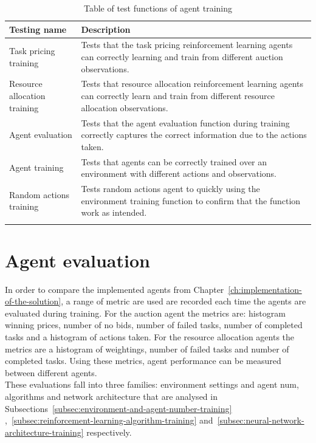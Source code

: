 \begin{longtable}{|p{3cm}|p{11cm}|} \hline
    \textbf{Testing name} & \textbf{Description} \\ \hline
    Task pricing training & Tests that the task pricing reinforcement learning agents can correctly learning and train
        from different auction observations. \\ \hline
    Resource allocation training & Tests that resource allocation reinforcement learning agents can correctly
        learn and train from different resource allocation observations. \\ \hline
    Agent evaluation & Tests that the agent evaluation function during training correctly captures the correct
        information due to the actions taken. \\ \hline
    Agent training & Tests that agents can be correctly trained over an environment with different actions and
        observations. \\ \hline
    Random actions training & Tests random actions agent to quickly using the environment training function to confirm
        that the function work as intended. \\ \hline
    \caption{Table of test functions of agent training}
    \label{tab:training_testing}
\end{longtable}

\section{Agent evaluation}\label{sec:agent-evaluation}
In order to compare the implemented agents from Chapter~\ref{ch:implementation-of-the-solution}, a range of metric are
used are recorded each time the agents are evaluated during training. For the auction agent the metrics are: histogram
winning prices, number of no bids, number of failed tasks, number of completed tasks and a histogram of actions taken.
For the resource allocation agents the metrics are a histogram of weightings, number of failed tasks and number of
completed tasks. Using these metrics, agent performance can be measured between different agents. \\
These evaluations fall into three families: environment settings and agent num, algorithms and network architecture
that are analysed in Subsections~\ref{subsec:environment-and-agent-number-training}
,~\ref{subsec:reinforcement-learning-algorithm-training} and~\ref{subsec:neural-network-architecture-training}
respectively.

